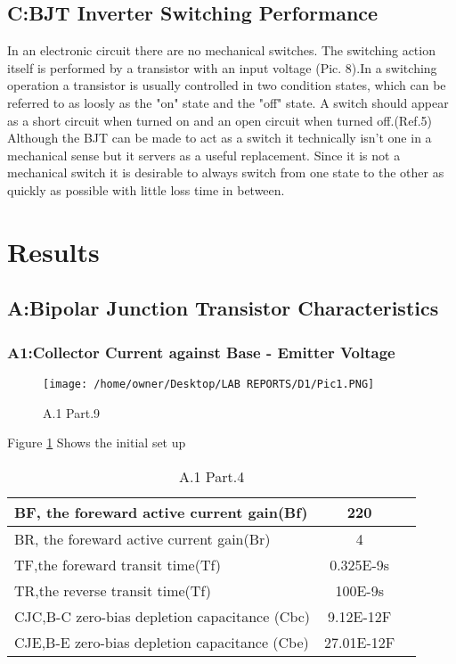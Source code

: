 \documentclass{article}
\begin{document}
\subsection{C:BJT Inverter Switching Performance}
In an electronic circuit there are no mechanical switches. The switching action itself is performed by a transistor with an input voltage (Pic. 8).In a switching operation a transistor is usually controlled in two condition states, which can be referred to as loosly as the "on" state and the "off" state. A switch should appear as a short circuit when turned on and an open circuit when turned off.(Ref.5)
Although the BJT can be made to act as a switch it technically isn't one in a mechanical sense but it servers as a useful replacement. Since it is not a mechanical switch it is desirable to always switch from one state to the other as quickly as possible with little loss time in between. 




\pagebreak


\section{Results}\label{sec:result}

\subsection{A:Bipolar Junction Transistor Characteristics}


\subsubsection{A1:Collector Current against Base - Emitter Voltage}
\begin{figure}[H]
	\centering
	\texttt{[image: /home/owner/Desktop/LAB REPORTS/D1/Pic1.PNG]}
	\caption[A.1 electronic set-up]{A.1 Part.9}
	\label{fig:pic}
\end{figure}
Figure \ref{fig:pic} Shows the initial set up

\begin{table}[H]

	\centering
	\label{tab:firstTable}
	\caption[A.1 Part.4 Table]{A.1 Part.4 }
	                  
	\begin{tabular}{lcr}
		BF, the foreward active current 
		gain(Bf)&220 \\ \hline 
		BR, the foreward active current
		gain(Br)&4\\ \hline
		TF,the foreward transit time(Tf)
		&0.325E-9s\\ \hline
		TR,the reverse transit time(Tf)
		&100E-9s\\ \hline
		CJC,B-C zero-bias depletion capacitance
		(Cbc)&9.12E-12F\\ \hline
		CJE,B-E zero-bias depletion capacitance
		(Cbe)&27.01E-12F\\ \hline
		

	\end{tabular}
\end{table}
\end{document}
